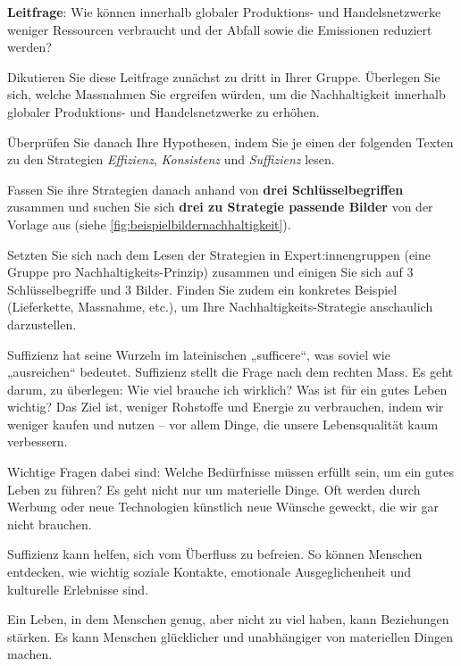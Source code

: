 \begin{myexercise}
    \textbf{Leitfrage}: Wie können innerhalb globaler Produktions- und Handelsnetzwerke weniger Ressourcen verbraucht und der Abfall sowie die Emissionen reduziert werden?

    Dikutieren Sie diese Leitfrage zunächst zu dritt in Ihrer Gruppe. Überlegen Sie sich, welche Massnahmen Sie ergreifen würden, um die Nachhaltigkeit innerhalb globaler Produktions- und Handelsnetzwerke zu erhöhen.

    Überprüfen Sie danach Ihre Hypothesen, indem Sie je einen der folgenden Texten zu den Strategien \textit{Effizienz}, \textit{Konsistenz} und \textit{Suffizienz} lesen.

    Fassen Sie ihre Strategien danach anhand von \textbf{drei Schlüsselbegriffen} zusammen und suchen Sie sich \textbf{drei zu Strategie passende Bilder} von der Vorlage aus (siehe \cref{fig:beispielbildernachhaltigkeit}).

    Setzten Sie sich nach dem Lesen der Strategien in Expert:innengruppen (eine Gruppe pro Nachhaltigkeits-Prinzip) zusammen und einigen Sie sich auf 3 Schlüsselbegriffe und 3 Bilder. Finden Sie zudem ein konkretes Beispiel (Lieferkette, Massnahme, etc.), um Ihre Nachhaltigkeits-Strategie anschaulich darzustellen.

    \begin{textBox}[title = Suffizienz -- anders konsumieren für ein gutes Leben für alle \cite{suffizienz}]

        Suffizienz hat seine Wurzeln im lateinischen „sufficere“, was soviel wie „ausreichen“ bedeutet. Suffizienz stellt die Frage nach dem rechten Mass. Es geht darum, zu überlegen: Wie viel brauche ich wirklich? Was ist für ein gutes Leben wichtig? Das Ziel ist, weniger Rohstoffe und Energie zu verbrauchen, indem wir weniger kaufen und nutzen -- vor allem Dinge, die unsere Lebensqualität kaum verbessern.

        Wichtige Fragen dabei sind: Welche Bedürfnisse müssen erfüllt sein, um ein gutes Leben zu führen? Es geht nicht nur um materielle Dinge. Oft werden durch Werbung oder neue Technologien künstlich neue Wünsche geweckt, die wir gar nicht brauchen.

        Suffizienz kann helfen, sich vom Überfluss zu befreien. So können Menschen entdecken, wie wichtig soziale Kontakte, emotionale Ausgeglichenheit und kulturelle Erlebnisse sind.

        Ein Leben, in dem Menschen genug, aber nicht zu viel haben, kann Beziehungen stärken. Es kann Menschen glücklicher und unabhängiger von materiellen Dingen machen.


\end{textBox}
\end{myexercise}
